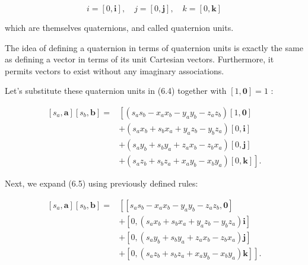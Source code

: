 $$
    i=[0, \mathbf{i}], \quad j=[0, \mathbf{j}], \quad k=[0, \mathbf{k}]
$$

which are themselves quaternions, and called quaternion units.

The idea of defining a quaternion in terms of quaternion units is exactly the same as defining a vector in terms of its unit Cartesian vectors. Furthermore, it permits vectors to exist without any imaginary associations.

Let's substitute these quaternion units in (6.4) together with $[1, \mathbf{0}]=1$ :

$$
    \begin{aligned}
        {\left[s_{a}, \mathbf{a}\right]\left[s_{b}, \mathbf{b}\right]=} & {\left[\left(s_{a} s_{b}-x_{a} x_{b}-y_{a} y_{b}-z_{a} z_{b}\right)[1, \mathbf{0}]\right.}  \\
                                                                        & +\left(s_{a} x_{b}+s_{b} x_{a}+y_{a} z_{b}-y_{b} z_{a}\right)[0, \mathbf{i}]                \\
                                                                        & +\left(s_{a} y_{b}+s_{b} y_{a}+z_{a} x_{b}-z_{b} x_{a}\right)[0, \mathbf{j}]                \\
                                                                        & \left.+\left(s_{a} z_{b}+s_{b} z_{a}+x_{a} y_{b}-x_{b} y_{a}\right)[0, \mathbf{k}]\right] .
    \end{aligned}
$$

Next, we expand (6.5) using previously defined rules:

$$
    \begin{aligned}
        {\left[s_{a}, \mathbf{a}\right]\left[s_{b}, \mathbf{b}\right]=} & {\left[\left[s_{a} s_{b}-x_{a} x_{b}-y_{a} y_{b}-z_{a} z_{b}, \mathbf{0}\right]\right.}                \\
                                                                        & +\left[0,\left(s_{a} x_{b}+s_{b} x_{a}+y_{a} z_{b}-y_{b} z_{a}\right) \mathbf{i}\right]                \\
                                                                        & +\left[0,\left(s_{a} y_{b}+s_{b} y_{a}+z_{a} x_{b}-z_{b} x_{a}\right) \mathbf{j}\right]                \\
                                                                        & \left.+\left[0,\left(s_{a} z_{b}+s_{b} z_{a}+x_{a} y_{b}-x_{b} y_{a}\right) \mathbf{k}\right]\right] .
    \end{aligned}
$$

